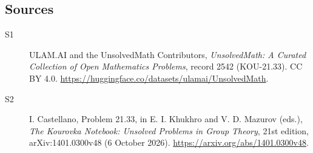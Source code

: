 \documentclass[11pt]{article}
\begin{document}
\subsection{Sources}
\begin{description}
\item[\hypertarget{source:2542:1}{S1}] ULAM.AI and the UnsolvedMath Contributors, \emph{UnsolvedMath: A Curated Collection of Open Mathematics Problems}, record 2542 (KOU-21.33). CC BY 4.0. \url{https://huggingface.co/datasets/ulamai/UnsolvedMath}.
\item[\hypertarget{source:2542:2}{S2}] I. Castellano, Problem 21.33, in E. I. Khukhro and V. D. Mazurov (eds.), \emph{The Kourovka Notebook: Unsolved Problems in Group Theory}, 21st edition, arXiv:1401.0300v48 (6 October 2026). \url{https://arxiv.org/abs/1401.0300v48}.
\end{description}
\label{end:2542}
\end{document}
